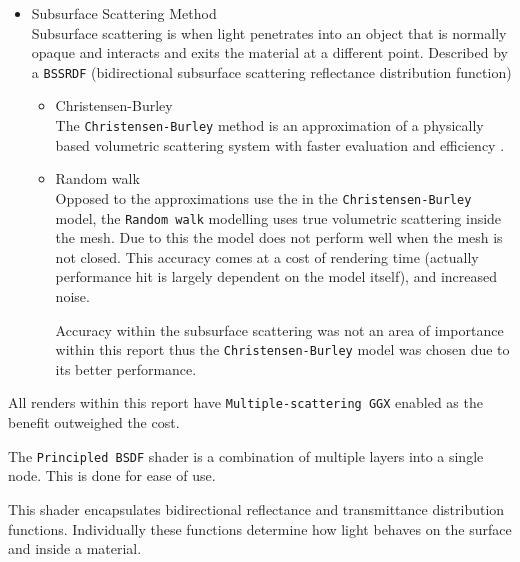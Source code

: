 \documentclass[11pt]{article}
\begin{document}
\begin{itemize}
\item Subsurface Scattering Method\\
Subsurface scattering is when light penetrates into an object that is normally
opaque and interacts and exits the material at a different point. Described
by a \texttt{BSSRDF} (bidirectional subsurface scattering reflectance distribution
function)
\begin{itemize}
\item Christensen-Burley \\
The \texttt{Christensen-Burley} method is an approximation of a physically based
volumetric scattering system with faster evaluation and efficiency \cite{Christensen-Burley}.
\item Random walk \\
Opposed to the approximations use the in the \texttt{Christensen-Burley} model,
the \texttt{Random walk} modelling uses true volumetric scattering inside the mesh.
Due to this the model does not perform well when the mesh is not closed.
This accuracy comes at a cost of rendering time (actually performance hit is largely
dependent on the model itself), and increased noise.

Accuracy within the subsurface scattering was not an area of importance
within this report thus the \texttt{Christensen-Burley} model was chosen due to
its better performance.
\end{itemize}
\end{itemize}

All renders within this report have \texttt{Multiple-scattering GGX} enabled as the
benefit outweighed the cost.

The \texttt{Principled BSDF} shader is a combination of multiple layers into a single
node. This is done for ease of use.

This shader encapsulates bidirectional reflectance and transmittance
distribution functions. Individually these functions determine how light behaves
on the surface and inside a material.
\end{document}
